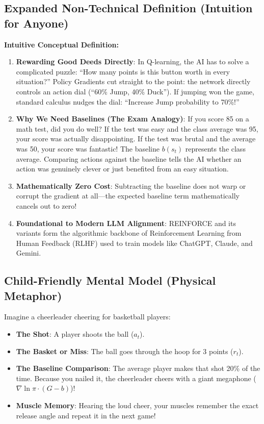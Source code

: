 \documentclass[11pt,a4paper]{article}
\theoremstyle{definition}
\begin{document}
\subsection{Expanded Non-Technical Definition (Intuition for Anyone)}
\textbf{Intuitive Conceptual Definition:}
\begin{enumerate}
    \item \textbf{Rewarding Good Deeds Directly}: In Q-learning, the AI has to solve a complicated puzzle: ``How many points is this button worth in every situation?'' Policy Gradients cut straight to the point: the network directly controls an action dial (``60\% Jump, 40\% Duck''). If jumping won the game, standard calculus nudges the dial: ``Increase Jump probability to 70\%!''
    \item \textbf{Why We Need Baselines (The Exam Analogy)}: If you score 85 on a math test, did you do well? If the test was easy and the class average was 95, your score was actually disappointing. If the test was brutal and the average was 50, your score was fantastic! The baseline $b(s_t)$ represents the class average. Comparing actions against the baseline tells the AI whether an action was genuinely clever or just benefited from an easy situation.
    \item \textbf{Mathematically Zero Cost}: Subtracting the baseline does not warp or corrupt the gradient at all—the expected baseline term mathematically cancels out to zero!
    \item \textbf{Foundational to Modern LLM Alignment}: REINFORCE and its variants form the algorithmic backbone of Reinforcement Learning from Human Feedback (RLHF) used to train models like ChatGPT, Claude, and Gemini.
\end{enumerate}

\subsection{Child-Friendly Mental Model (Physical Metaphor)}
Imagine a cheerleader cheering for basketball players:
\begin{itemize}
    \item \textbf{The Shot}: A player shoots the ball ($a_t$).
    \item \textbf{The Basket or Miss}: The ball goes through the hoop for 3 points ($r_t$).
    \item \textbf{The Baseline Comparison}: The average player makes that shot 20\% of the time. Because you nailed it, the cheerleader cheers with a giant megaphone ($\nabla \ln \pi \cdot (G - b)$)!
    \item \textbf{Muscle Memory}: Hearing the loud cheer, your muscles remember the exact release angle and repeat it in the next game!
\end{itemize}
\end{document}
